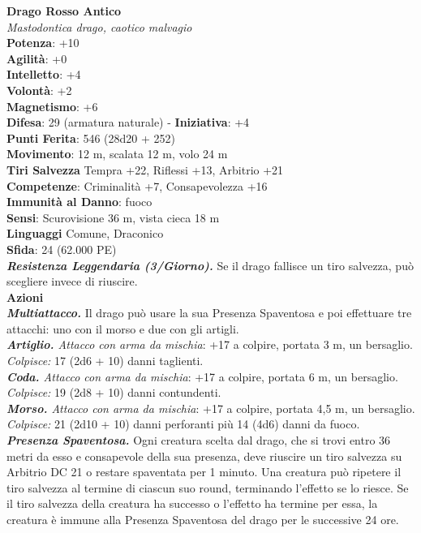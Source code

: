 \begin{multicols}{2}
\medskip\textbf{Drago Rosso Antico}\\
\emph{Mastodontica drago, caotico malvagio}\\
\textbf{Potenza}: +10\\
\textbf{Agilità}: +0\\
\textbf{Intelletto}: +4\\
\textbf{Volontà}: +2\\
\textbf{Magnetismo}: +6\\
\textbf{Difesa}: 29 (armatura naturale) - \textbf{Iniziativa}: +4\\
\textbf{Punti Ferita}: 546 (28d20 + 252)\\
\textbf{Movimento}: 12 m, scalata 12 m, volo 24 m\\
\textbf{Tiri Salvezza} Tempra +22, Riflessi +13, Arbitrio +21\\
\textbf{Competenze}: Criminalità +7, Consapevolezza +16\\
\textbf{Immunità al Danno}: fuoco\\
\textbf{Sensi}: Scurovisione 36 m, vista cieca 18 m\\
\textbf{Linguaggi} Comune, Draconico\\
\textbf{Sfida}: 24 (62.000 PE)\smallskip\\
\emph{\textbf{Resistenza Leggendaria (3/Giorno).}} Se il drago fallisce un tiro salvezza, può scegliere invece di riuscire.\\
\smallskip\textbf{Azioni}\\
\emph{\textbf{Multiattacco.}} Il drago può usare la sua Presenza Spaventosa e poi effettuare tre attacchi: uno con il morso e due con gli artigli.\\
\emph{\textbf{Artiglio.} Attacco con arma da mischia}: +17 a colpire, portata 3 m, un bersaglio.\\
\emph{Colpisce:} 17 (2d6 + 10) danni taglienti.\\
\emph{\textbf{Coda.} Attacco con arma da mischia}: +17 a colpire, portata 6 m, un bersaglio.\\
\emph{Colpisce:} 19 (2d8 + 10) danni contundenti.\\
\emph{\textbf{Morso.} Attacco con arma da mischia}: +17 a colpire, portata 4,5 m, un bersaglio.\\
\emph{Colpisce:} 21 (2d10 + 10) danni perforanti più 14 (4d6) danni da fuoco.\\
\emph{\textbf{Presenza Spaventosa.}} Ogni creatura scelta dal drago, che si trovi entro 36 metri da esso e consapevole della sua presenza, deve riuscire un tiro salvezza su Arbitrio DC 21 o restare spaventata per 1 minuto. Una creatura può ripetere il tiro salvezza al termine di ciascun suo round, terminando l'effetto se lo riesce. Se il tiro salvezza della creatura ha successo o l'effetto ha termine per essa, la creatura è immune alla Presenza Spaventosa del drago per le successive 24 ore.\\

\end{multicols}
